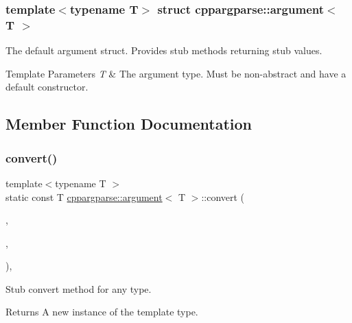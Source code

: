 \subsubsection*{template$<$typename T$>$\newline
struct cppargparse\+::argument$<$ T $>$}

The default argument struct. Provides stub methods returning stub values. 


\begin{DoxyTemplParams}{Template Parameters}
{\em T} & The argument type. Must be non-\/abstract and have a default constructor. \\
\hline
\end{DoxyTemplParams}


\subsection{Member Function Documentation}
\mbox{\label{structcppargparse_1_1argument_a2051f71ef4ed0b9d299cc58bb494e42b}} 
\subsubsection{\texorpdfstring{convert()}{convert()}}
{\footnotesize\ttfamily template$<$typename T $>$ \\
static const T \hyperlink{structcppargparse_1_1argument}{cppargparse\+::argument}$<$ T $>$\+::convert (\begin{DoxyParamCaption}\item[{const types\+::\+Command\+Line\+\_\+t \&}]{,  }\item[{const types\+::\+Command\+Line\+Position\+\_\+t \&}]{,  }\item[{const types\+::\+Command\+Line\+Arguments\+\_\+t \&}]{ }\end{DoxyParamCaption})\hspace{0.3cm}{\ttfamily [inline]}, {\ttfamily [static]}}



Stub convert method for any type. 

\begin{DoxyReturn}{Returns}
A new instance of the template type. 
\end{DoxyReturn}
\mbox{\label{structcppargparse_1_1argument_a40c742ace10b7eeb56f2e49429f9be33}} 
